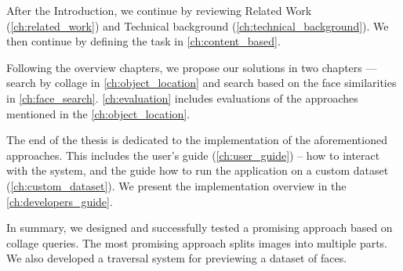 After the Introduction, we continue by reviewing Related Work (\autoref{ch:related_work}) and Technical background (\autoref{ch:technical_background}). We then continue by defining the task in \autoref{ch:content_based}.

Following the overview chapters, we propose our solutions in two chapters --- search by collage in \autoref{ch:object_location} and search based on the face similarities in \autoref{ch:face_search}. \autoref{ch:evaluation} includes evaluations of the approaches mentioned in the \autoref{ch:object_location}.

The end of the thesis is dedicated to the implementation of the aforementioned approaches. This includes the user's guide (\autoref{ch:user_guide}) -- how to interact with the system, and the guide how to run the application on a custom dataset (\autoref{ch:custom_dataset}). We present the implementation overview in the \autoref{ch:developers_guide}.

\bigskip

In summary, we designed and successfully tested a promising approach based on collage queries. The most promising approach splits images into multiple parts. We also developed a traversal system for previewing a dataset of faces.